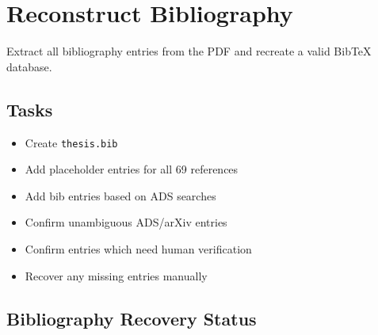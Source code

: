 \documentclass{article}
\newcommand{\done}{\textcolor{green!60!black}{\ding{51}}}
\begin{document}
\section{\done Reconstruct Bibliography}

Extract all bibliography entries from the PDF and recreate a valid BibTeX database.

\subsection{Tasks}
\begin{itemize}
\item[\done] Create \texttt{thesis.bib}
\item[\done] Add placeholder entries for all 69 references
\item[\done] Add bib entries based on ADS searches
\item[\done] Confirm unambiguous ADS/arXiv entries
\item[\done] Confirm entries which need human verification
\item[\done] Recover any missing entries manually
\end{itemize}

\subsection{Bibliography Recovery Status}

\small
\end{document}
